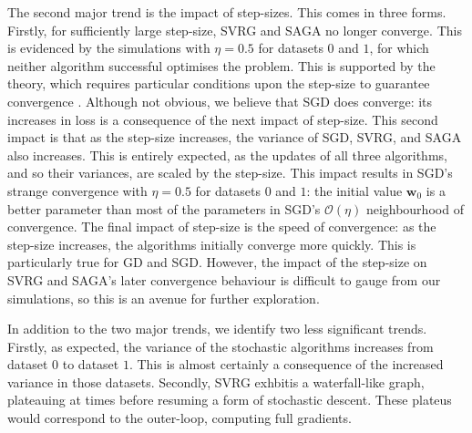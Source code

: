 The second major trend is the impact of step-sizes. This comes in three forms. Firstly, for sufficiently large step-size, SVRG and SAGA no longer converge. This is evidenced by the simulations with $\eta = 0.5$ for datasets $0$ and $1$, for which neither algorithm successful optimises the problem. This is supported by the theory, which requires particular conditions upon the step-size to guarantee convergence \cite{reddi2016stochastic}. Although not obvious, we believe that SGD does converge: its increases in loss is a consequence of the next impact of step-size. This second impact is that as the step-size increases, the variance of SGD, SVRG, and SAGA also increases. This is entirely expected, as the updates of all three algorithms, and so their variances, are scaled by the step-size. This impact results in SGD's strange convergence with $\eta = 0.5$ for datasets $0$ and $1$: the initial value $\textbf{w}_0$ is a better parameter than most of the parameters in SGD's $\mathcal{O}\left(\eta\right)$ neighbourhood of convergence. The final impact of step-size is the speed of convergence: as the step-size increases, the algorithms initially converge more quickly. This is particularly true for GD and SGD. However, the impact of the step-size on SVRG and SAGA's later convergence behaviour is difficult to gauge from our simulations, so this is an avenue for further exploration.

In addition to the two major trends, we identify two less significant trends. Firstly, as expected,  the variance of the stochastic algorithms increases from dataset $0$ to dataset $1$. This is almost certainly a consequence of the increased variance in those datasets. Secondly, SVRG exhbitis a waterfall-like graph, plateauing at times before resuming a form of stochastic descent. These plateus would correspond to the outer-loop, computing full gradients. 